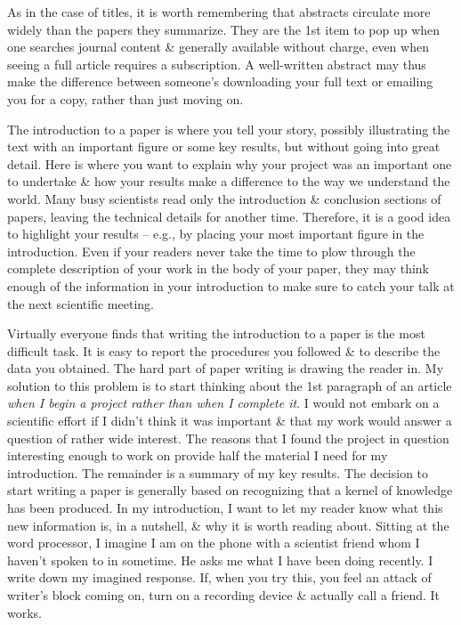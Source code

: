 \documentclass{article}
\numberwithin{equation}{section}
\begin{document}
As in the case of titles, it is worth remembering that abstracts circulate more widely than the papers they summarize. They are the 1st item to pop up when one searches journal content \& generally available without charge, even when seeing a full article requires a subscription. A well-written abstract may thus make the difference between someone's downloading your full text or emailing you for a copy, rather than just moving on.

The introduction to a paper is where you tell your story, possibly illustrating the text with an important figure or some key results, but without going into great detail. Here is where you want to explain why your project was an important one to undertake \& how your results make a difference to the way we understand the world. Many busy scientists read only the introduction \& conclusion sections of papers, leaving the technical details for another time. Therefore, it is a good idea to highlight your results -- e.g., by placing your most important figure in the introduction. Even if your readers never take the time to plow through the complete description of your work in the body of your paper, they may think enough of the information in your introduction to make sure to catch your talk at the next scientific meeting.

Virtually everyone finds that writing the introduction to a paper is the most difficult task. It is easy to report the procedures you followed \& to describe the data you obtained. The hard part of paper writing is drawing the reader in. My solution to this problem is to start thinking about the 1st paragraph of an article \textit{when I begin a project rather than when I complete it}. I would not embark on a scientific effort if I didn't think it was important \& that my work would answer a question of rather wide interest. The reasons that I found the project in question interesting enough to work on provide half the material I need for my introduction. The remainder is a summary of my key results. The decision to start writing a paper is generally based on recognizing that a kernel of knowledge has been produced. In my introduction, I want to let my reader know what this new information is, in a nutshell, \& why it is worth reading about. Sitting at the word processor, I imagine I am on the phone with a scientist friend whom I haven't spoken to in sometime. He asks me what I have been doing recently. I write down my imagined response. If, when you try this, you feel an attack of writer's block coming on, turn on a recording device \& actually call a friend. It works.
\end{document}
